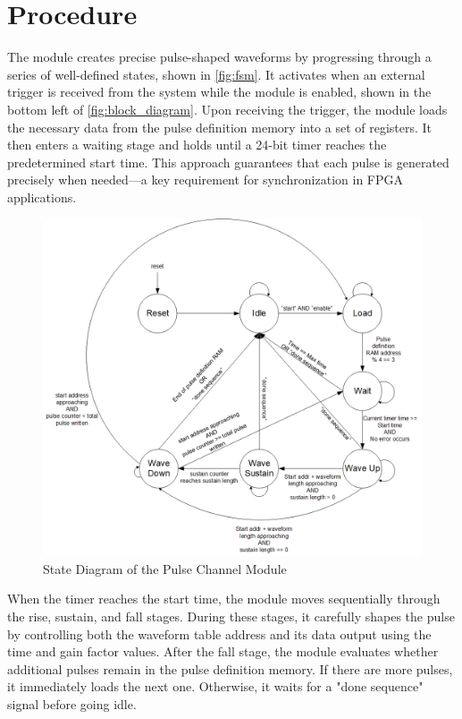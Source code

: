\section{Procedure}
The module creates precise pulse-shaped waveforms by progressing through a series of well-defined states, shown in \autoref{fig:fsm}. It activates when an external trigger is received from the system while the module is enabled, shown in the bottom left of \autoref{fig:block_diagram}. Upon receiving the trigger, the module loads the necessary data from the pulse definition memory into a set of registers. It then enters a waiting stage and holds until a 24-bit timer reaches the predetermined start time. This approach guarantees that each pulse is generated precisely when needed—a key requirement for synchronization in FPGA applications.
\begin{figure}[htbp]
    \centering
    \includegraphics[width=1\linewidth]{figures/3.4.png}
    \caption{State Diagram of the Pulse Channel Module}
    \label{fig:fsm}
\end{figure}
When the timer reaches the start time, the module moves sequentially through the rise, sustain, and fall stages. During these stages, it carefully shapes the pulse by controlling both the waveform table address and its data output using the time and gain factor values. After the fall stage, the module evaluates whether additional pulses remain in the pulse definition memory. If there are more pulses, it immediately loads the next one. Otherwise, it waits for a "done sequence" signal before going idle.

